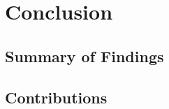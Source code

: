 \section{Conclusion}
\label{ch:conclusion}


\subsection{Summary of Findings}
\label{sec:summary}


\subsection{Contributions}
\label{sec:contributions}


